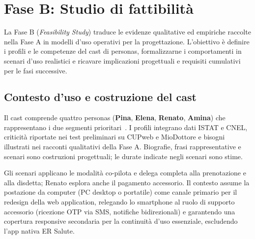 \chapter{Fase B: Studio di fattibilità}

La Fase B (\emph{Feasibility Study}) traduce le evidenze qualitative ed empiriche raccolte nella Fase A in modelli d'uso operativi per la progettazione. L'obiettivo è definire i profili e le competenze del cast di personas, formalizzarne i comportamenti in scenari d'uso realistici e ricavare implicazioni progettuali e requisiti cumulativi per le fasi successive.

\section{Contesto d'uso e costruzione del cast}

Il cast comprende quattro personas (\textbf{Pina}, \textbf{Elena}, \textbf{Renato}, \textbf{Amina}) che rappresentano i due segmenti prioritari~\cite{cooperAboutFace2007}. I profili integrano dati ISTAT e CNEL, criticità riportate nei test preliminari su CUPweb e MioDottore e bisogni illustrati nei racconti qualitativi della Fase A. Biografie, frasi rappresentative e scenari sono costruzioni progettuali; le durate indicate negli scenari sono stime.

Gli scenari applicano le modalità co-pilota e delega completa alla prenotazione e alla disdetta; Renato esplora anche il pagamento accessorio. Il contesto assume la postazione da computer (PC desktop o portatile) come canale primario per il redesign della web application, relegando lo smartphone al ruolo di supporto accessorio (ricezione OTP via SMS, notifiche bidirezionali) e garantendo una copertura responsive secondaria per la continuità d'uso essenziale, escludendo l'app nativa ER Salute.

